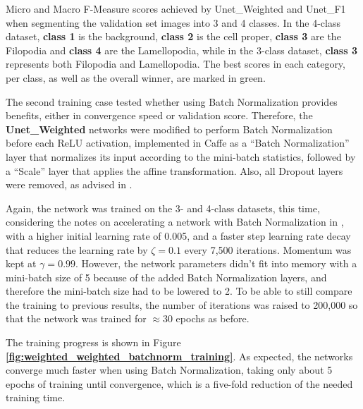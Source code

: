\begin {table}
\caption[Micro and Macro F-Measure scores for Unet\_Weighted and Unet\_F1.]{Micro and Macro F-Measure scores achieved by Unet\_Weighted and Unet\_F1 when segmenting the validation set images into 3 and 4 classes. In the 4-class dataset, \textbf{class 1} is the background, \textbf{class 2} is the cell proper, \textbf{class 3} are the Filopodia and \textbf{class 4} are the Lamellopodia, while in the 3-class dataset, \textbf{class 3} represents both Filopodia and Lamellopodia. The best scores in each category, per class, as well as the overall winner, are marked in green.}
\label{tab:results1}
\end {table}

\noindent The second training case tested whether using Batch Normalization provides benefits, either in convergence speed or validation score. Therefore, the \textbf{Unet\_\-Weighted} networks were modified to perform Batch Normalization before each ReLU activation, implemented in Caffe as a ``Batch Normalization'' layer that normalizes its input according to the mini-batch statistics, followed by a ``Scale'' layer that applies the affine transformation. Also, all Dropout layers were removed, as advised in \cite{batchnorm}.

Again, the network was trained on the 3- and 4-class datasets, this time, considering the notes on accelerating a network with Batch Normalization in \cite{batchnorm}, with a higher initial learning rate of 0.005, and a faster step learning rate decay that reduces the learning rate by $\zeta = 0.1$ every 7,500 iterations. Momentum was kept at $\gamma = 0.99$. However, the network parameters didn't fit into memory with a mini-batch size of 5 because of the added Batch Normalization layers, and therefore the mini-batch size had to be lowered to 2. To be able to still compare the training to previous results, the number of iterations was raised to 200,000 so that the network was trained for $\approx$30 epochs as before.

The training progress is shown in Figure \textbf{\ref{fig:weighted_weighted_batchnorm_training}}. As expected, the networks converge much faster when using Batch Normalization, taking only about 5 epochs of training until convergence, which is a five-fold reduction of the needed training time.\\


